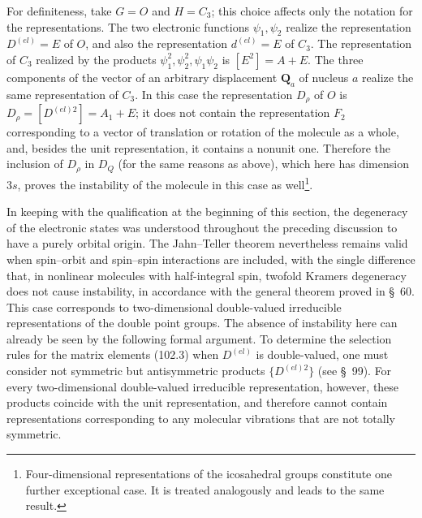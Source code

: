 For definiteness, take $G=O$ and $H=C_3$; this choice affects only the notation for the representations. The two electronic functions $\psi_1,\psi_2$ realize the representation $D^{(el)}=E$ of $O$, and also the representation $d^{(el)}=E$ of $C_3$. The representation of $C_3$ realized by the products $\psi_1^2,\psi_2^2,\psi_1\psi_2$ is $[E^2]=A+E$. The three components of the vector of an arbitrary displacement $\mathbf Q_a$ of nucleus $a$ realize the same representation of $C_3$. In this case the representation $D_\rho$ of $O$ is $D_\rho=[D^{(el)2}]=A_1+E$; it does not contain the representation $F_2$ corresponding to a vector of translation or rotation of the molecule as a whole, and, besides the unit representation, it contains a nonunit one. Therefore the inclusion of $D_\rho$ in $D_Q$ (for the same reasons as above), which here has dimension $3s$, proves the instability of the molecule in this case as well\footnote{Four-dimensional representations of the icosahedral groups constitute one further exceptional case. It is treated analogously and leads to the same result.}.

In keeping with the qualification at the beginning of this section, the degeneracy of the electronic states was understood throughout the preceding discussion to have a purely orbital origin. The Jahn--Teller theorem nevertheless remains valid when spin--orbit and spin--spin interactions are included, with the single difference that, in nonlinear molecules with half-integral spin, twofold Kramers degeneracy does not cause instability, in accordance with the general theorem proved in \S~60. This case corresponds to two-dimensional double-valued irreducible representations of the double point groups. The absence of instability here can already be seen by the following formal argument. To determine the selection rules for the matrix elements (102.3) when $D^{(el)}$ is double-valued, one must consider not symmetric but antisymmetric products $\{D^{(el)2}\}$ (see \S~99). For every two-dimensional double-valued irreducible representation, however, these products coincide with the unit representation, and therefore cannot contain representations corresponding to any molecular vibrations that are not totally symmetric.
